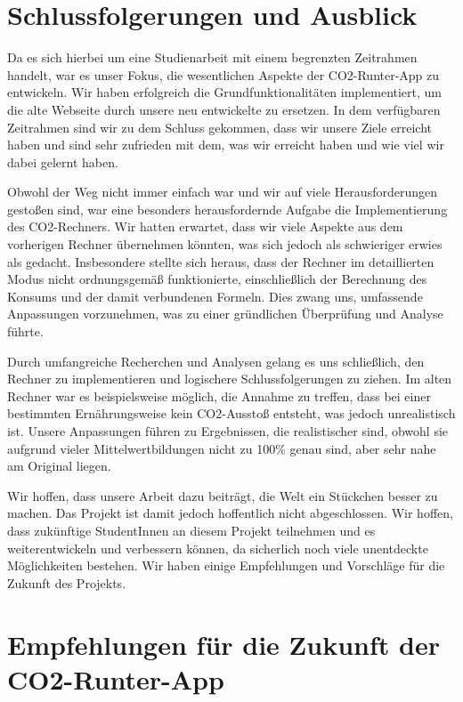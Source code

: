 \section{Schlussfolgerungen und Ausblick}

Da es sich hierbei um eine Studienarbeit mit einem begrenzten Zeitrahmen handelt, war es unser Fokus, die wesentlichen Aspekte der CO2-Runter-App zu entwickeln. Wir haben erfolgreich die Grundfunktionalitäten implementiert, um die alte Webseite durch unsere neu entwickelte zu ersetzen. In dem verfügbaren Zeitrahmen sind wir zu dem Schluss gekommen, dass wir unsere Ziele erreicht haben und sind sehr zufrieden mit dem, was wir erreicht haben und wie viel wir dabei gelernt haben.

Obwohl der Weg nicht immer einfach war und wir auf viele Herausforderungen gestoßen sind, war eine besonders herausfordernde Aufgabe die Implementierung des CO2-Rechners. Wir hatten erwartet, dass wir viele Aspekte aus dem vorherigen Rechner übernehmen könnten, was sich jedoch als schwieriger erwies als gedacht. Insbesondere stellte sich heraus, dass der Rechner im detaillierten Modus nicht ordnungsgemäß funktionierte, einschließlich der Berechnung des Konsums und der damit verbundenen Formeln. Dies zwang uns, umfassende Anpassungen vorzunehmen, was zu einer gründlichen Überprüfung und Analyse führte.

Durch umfangreiche Recherchen und Analysen gelang es uns schließlich, den Rechner zu implementieren und logischere Schlussfolgerungen zu ziehen. Im alten Rechner war es beispielsweise möglich, die Annahme zu treffen, dass bei einer bestimmten Ernährungsweise kein CO2-Ausstoß entsteht, was jedoch unrealistisch ist. Unsere Anpassungen führen zu Ergebnissen, die realistischer sind, obwohl sie aufgrund vieler Mittelwertbildungen nicht zu 100\% genau sind, aber sehr nahe am Original liegen.

Wir hoffen, dass unsere Arbeit dazu beiträgt, die Welt ein Stückchen besser zu machen. Das Projekt ist damit jedoch hoffentlich nicht abgeschlossen. Wir hoffen, dass zukünftige StudentInnen an diesem Projekt teilnehmen und es weiterentwickeln und verbessern können, da sicherlich noch viele unentdeckte Möglichkeiten bestehen. Wir haben einige Empfehlungen und Vorschläge für die Zukunft des Projekts.

\section{Empfehlungen für die Zukunft der CO2-Runter-App}

